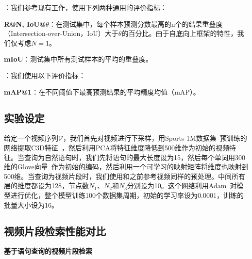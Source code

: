 \noindent\textbf{}：我们参考现有工作，使用下列两种通用的评价指标：

\noindent\textbf{R@N, IoU@$\theta$}：在测试集中，每个样本预测分数最高的n个的结果重叠度（Intersection-over-Union，IoU）大于$\theta$的百分比。由于自底向上框架的特性，我们仅考虑$N=1$。

\noindent\textbf{mIoU}：测试集中所有测试样本的平均的重叠度。


\noindent\textbf{}：我们使用以下评价指标：

\noindent\textbf{mAP@1}：在不同阈值下最高预测结果的平均精度均值（mAP）。


\subsection{实验设定}
给定一个视频序列$\mathcal{V}$，我们首先对视频进行下采样，用Sports-1M数据集~\cite{karpathy2014large}预训练的网络提取C3D特征~\cite{tran2015learning}，然后利用PCA将特征维度降低到500维作为初始的视频特征。当查询为自然语句时，我们先将语句的最大长度设为15，然后每个单词用300维的Glove向量~\cite{pennington2014glove}作为初始的编码，然后利用一个可学习的映射矩阵将维度也映射到500维。当查询为视频片段时，我们使用和之前参考视频同样的预处理。中间所有层的维度都设为128，节点数$N_1$、$N_2$和$N_3$分别设为10。这个网络利用Adam~\cite{kingma2015adam}对模型进行优化，整个模型训练100个数据集周期，初始的学习率设为0.0001，训练的批量大小设为16。


\subsection{视频片段检索性能对比}

\textbf{基于语句查询的视频片段检索}


